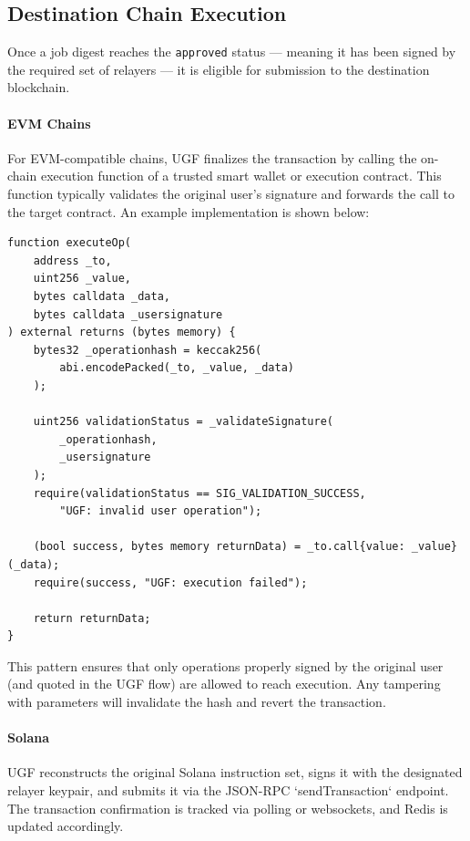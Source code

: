 \documentclass{article}
\begin{document}
\subsection{Destination Chain Execution}

Once a job digest reaches the \texttt{approved} status — meaning it has been signed by the required set of relayers — it is eligible for submission to the destination blockchain.

\paragraph{EVM Chains} 
For EVM-compatible chains, UGF finalizes the transaction by calling the on-chain execution function of a trusted smart wallet or execution contract. This function typically validates the original user's signature and forwards the call to the target contract. An example implementation is shown below:

\begin{lstlisting}[language=Solidity, caption={EVM Smart Execution}]
function executeOp(
    address _to,
    uint256 _value,
    bytes calldata _data,
    bytes calldata _usersignature
) external returns (bytes memory) {
    bytes32 _operationhash = keccak256(
        abi.encodePacked(_to, _value, _data)
    );

    uint256 validationStatus = _validateSignature(
        _operationhash,
        _usersignature
    );
    require(validationStatus == SIG_VALIDATION_SUCCESS,
        "UGF: invalid user operation");

    (bool success, bytes memory returnData) = _to.call{value: _value}(_data);
    require(success, "UGF: execution failed");

    return returnData;
}
\end{lstlisting}

This pattern ensures that only operations properly signed by the original user (and quoted in the UGF flow) are allowed to reach execution. Any tampering with parameters will invalidate the hash and revert the transaction.


\paragraph{Solana} 
UGF reconstructs the original Solana instruction set, signs it with the designated relayer keypair, and submits it via the JSON-RPC `sendTransaction` endpoint. The transaction confirmation is tracked via polling or websockets, and Redis is updated accordingly.
\end{document}
